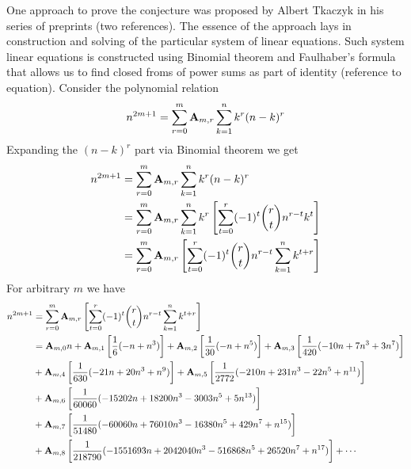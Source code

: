 One approach to prove the conjecture was proposed by Albert Tkaczyk in his series of preprints (two references).
The essence of the approach lays in construction and solving of the particular system of linear equations.
Such system linear equations is constructed using Binomial theorem and Faulhaber's formula
that allows us to find closed froms of power sums as part of identity (reference to equation).
Consider the polynomial relation
\begin{equation}
    n^{2m+1} = \sum_{r=0}^{m} {\mathbf{A}} \sb{m,r} \sum_{k=1}^{n} k^{r} (n-k)^{r}\label{eq:odd-power-identity}
\end{equation}
Expanding the $(n-k)^r$ part via Binomial theorem we get
\begin{equation}
    \begin{split}
        n^{2m+1} &= \sum_{r=0}^{m} {\mathbf{A}} \sb{m,r} \sum_{k=1}^{n} k^{r} (n-k)^{r} \\
        &= \sum_{r=0}^{m} {\mathbf{A}} \sb{m,r} \sum_{k=1}^{n} k^{r} \left[ \sum_{t=0}^{r} (-1)^t \binom{r}{t} n^{r-t} k^{t} \right] \\
        &= \sum_{r=0}^{m} {\mathbf{A}} \sb{m,r} \left[ \sum_{t=0}^{r} (-1)^t \binom{r}{t} n^{r-t} \sum_{k=1}^{n} k^{t+r} \right] \\
    \end{split}\label{eq:equation2}
\end{equation}
For arbitrary $m$ we have
\begin{equation}
    \begin{split}
        n^{2m+1}
        &= \sum_{r=0}^{m} {\mathbf{A}} \sb{m,r} \left[ \sum_{t=0}^{r} (-1)^t \binom{r}{t} n^{r-t} \sum_{k=1}^{n} k^{t+r} \right] \\
        &= {\mathbf{A}} \sb{m,0} n
        + {\mathbf{A}} \sb{m,1} \left[ \frac{1}{6} (-n + n^3) \right]
        + {\mathbf{A}} \sb{m,2} \left[ \frac{1}{30} (-n + n^5) \right]
        + {\mathbf{A}} \sb{m,3} \left[ \frac{1}{420} (-10 n + 7 n^3 + 3 n^7) \right] \\
        &+ {\mathbf{A}} \sb{m,4} \left[ \frac{1}{630} (-21 n + 20 n^3 + n^9) \right]
        + {\mathbf{A}} \sb{m,5} \left[ \frac{1}{2772} (-210 n + 231 n^3 - 22 n^5 + n^{11}) \right] \\
        &+ {\mathbf{A}} \sb{m,6} \left[ \frac{1}{60060} (-15202 n + 18200 n^3 - 3003 n^5 + 5 n^{13}) \right] \\
        &+ {\mathbf{A}} \sb{m,7} \left[ \frac{1}{51480} (-60060 n + 76010 n^3 - 16380 n^5 + 429 n^7 + n^{15}) \right] \\
        &+ {\mathbf{A}} \sb{m,8} \left[ \frac{1}{218790} (-1551693 n + 2042040 n^3 - 516868 n^5 + 26520 n^7 + n^{17}) \right] + \cdots
    \end{split}\label{eq:equation17}
\end{equation}


